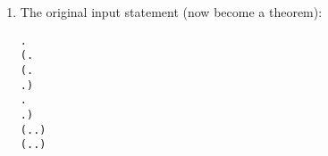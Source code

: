 \begin{enumerate}
\item The original input statement (now become a theorem):
\begin{small}
\begin{alltt}
\HOLTokenTurnstile{} \HOLSymConst{\HOLTokenForall{}} .
       (\HOLSymConst{\HOLTokenForall{}}.
            (\HOLSymConst{\HOLTokenForall{}}.
                  \HOLTokenTransBegin{} \HOLTokenTransEnd {} \HOLSymConst{\HOLTokenImp{}}
                 \HOLSymConst{\HOLTokenExists{}}.  \HOLTokenWeakTransBegin{} \HOLTokenWeakTransEnd {} \HOLSymConst{\HOLTokenConj{}}  \HOLSymConst{\HOLTokenWeakEQ} ) \HOLSymConst{\HOLTokenConj{}}
            \HOLSymConst{\HOLTokenForall{}}.
                 \HOLTokenTransBegin{} \HOLTokenTransEnd {} \HOLSymConst{\HOLTokenImp{}} \HOLSymConst{\HOLTokenExists{}}.  \HOLTokenWeakTransBegin{} \HOLTokenWeakTransEnd {} \HOLSymConst{\HOLTokenConj{}}  \HOLSymConst{\HOLTokenWeakEQ} ) \HOLSymConst{\HOLTokenConj{}}
       (\HOLSymConst{\HOLTokenForall{}}.  \HOLTokenTransBegin\HOLSymConst{\ensuremath{\tau}}\HOLTokenTransEnd {} \HOLSymConst{\HOLTokenImp{}} \HOLSymConst{\HOLTokenExists{}}.  \HOLSymConst{\HOLTokenEPS}  \HOLSymConst{\HOLTokenConj{}}  \HOLSymConst{\HOLTokenWeakEQ} ) \HOLSymConst{\HOLTokenConj{}}
       (\HOLSymConst{\HOLTokenForall{}}.  \HOLTokenTransBegin\HOLSymConst{\ensuremath{\tau}}\HOLTokenTransEnd {} \HOLSymConst{\HOLTokenImp{}} \HOLSymConst{\HOLTokenExists{}}.  \HOLSymConst{\HOLTokenEPS}  \HOLSymConst{\HOLTokenConj{}}  \HOLSymConst{\HOLTokenWeakEQ} ) \HOLSymConst{\HOLTokenImp{}}

\end{alltt}
\end{small}
\end{enumerate}
